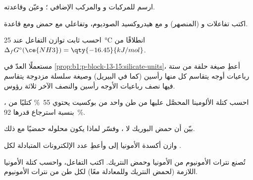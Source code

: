 \begin{exercise}[$\star$]\label{exo:b1:p-block-13-15:2}
ارسم  للمركبات  و والمركب الإضافي
؛ وعيّن  وقاعدته.
\end{exercise}

\begin{exercise}[$\star$]\label{exo:b1:p-block-13-15:3}
اكتب تفاعلات  و (المنصهر) و مع
هيدروكسيد الصوديوم، وتفاعلي  مع حمض ومع قاعدة.
\end{exercise}

\begin{exercise}[$\star$]\label{exo:b1:p-block-13-15:4}
احسب ثابت توازن التفاعل  عند
\qty{25}{\celsius} انطلاقًا من $\Delta_f G^\circ(\ce{NH3}) =
\qty{-16.45}{kJ/mol}$.
\end{exercise}

\begin{exercise}[$\star\star$]\label{exo:b1:p-block-13-15:5}
مستعملًا العدّ في \cref{prop:b1:p-block-13-15:silicate-units}، أعطِ
صيغة حلقة من ستة رباعيات أوجه يتقاسم كل منها رأسين (كما في البيريل)
وصيغة سلسلة مزدوجة يتقاسم فيها نصف رباعيات الأوجه رأسين
والنصف الآخر ثلاثة رؤوس.
\end{exercise}

\begin{exercise}[$\star\star$]\label{exo:b1:p-block-13-15:6}
احسب كتلة الألومينا المحصَّل عليها من طن واحد من بوكسيت يحتوي
\qty{55}{\percent} كتليًا من ، بنسبة استرجاع قدرها \qty{92}{\percent}.
\end{exercise}

\begin{exercise}[$\star\star$]\label{exo:b1:p-block-13-15:7}
بيّن أن حمض البوريك  لا ،
وفسّر لماذا يكون محلوله حمضيًا مع ذلك.
\end{exercise}

\begin{exercise}[$\star\star$]\label{exo:b1:p-block-13-15:8}
وازن أكسدة الأمونيا إلى  
وأعطِ عدد الإلكترونات المتبادلة لكل .
\end{exercise}

\begin{exercise}[$\star\star$]\label{exo:b1:p-block-13-15:9}
تُصنع نترات الأمونيوم من الأمونيا وحمض النتريك. اكتب التفاعل،
واحسب كتلة الأمونيا اللازمة (لحمض النتريك وللمعادلة
معًا) لكل طن من نترات الأمونيوم.
\end{exercise}

